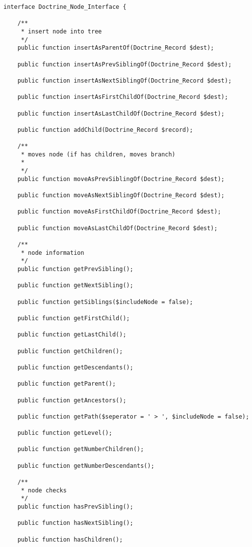 \documentclass[11pt,a4paper]{report}
\begin{document}
\begin{verbatim}
interface Doctrine_Node_Interface {

    /**
     * insert node into tree
     */
    public function insertAsParentOf(Doctrine_Record $dest);

    public function insertAsPrevSiblingOf(Doctrine_Record $dest);

    public function insertAsNextSiblingOf(Doctrine_Record $dest);

    public function insertAsFirstChildOf(Doctrine_Record $dest);

    public function insertAsLastChildOf(Doctrine_Record $dest);

    public function addChild(Doctrine_Record $record);

    /**
     * moves node (if has children, moves branch)
     *
     */
    public function moveAsPrevSiblingOf(Doctrine_Record $dest);

    public function moveAsNextSiblingOf(Doctrine_Record $dest);

    public function moveAsFirstChildOf(Doctrine_Record $dest);

    public function moveAsLastChildOf(Doctrine_Record $dest);

    /**
     * node information
     */
    public function getPrevSibling();

    public function getNextSibling();

    public function getSiblings($includeNode = false);

    public function getFirstChild();

    public function getLastChild();

    public function getChildren();

    public function getDescendants();

    public function getParent();

    public function getAncestors();

    public function getPath($seperator = ' > ', $includeNode = false);

    public function getLevel();

    public function getNumberChildren();

    public function getNumberDescendants();

    /**
     * node checks
     */
    public function hasPrevSibling();

    public function hasNextSibling();

    public function hasChildren();


\end{verbatim}
\end{document}
